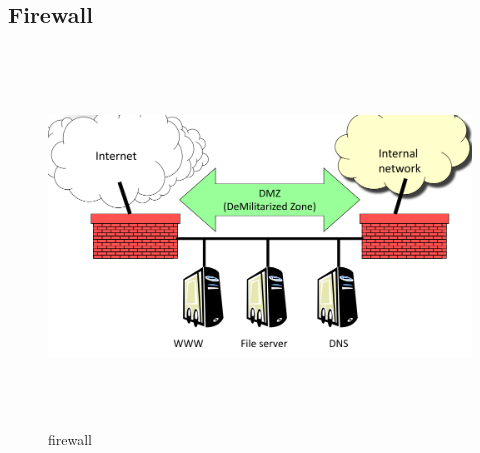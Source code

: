 \subsection{Firewall}
\begin{figure}[h]
    \vspace{10mm}
    \centering
    \includegraphics[width=16cm, height=10cm]{image/firewall.png}
    \caption{firewall}
\end{figure}
